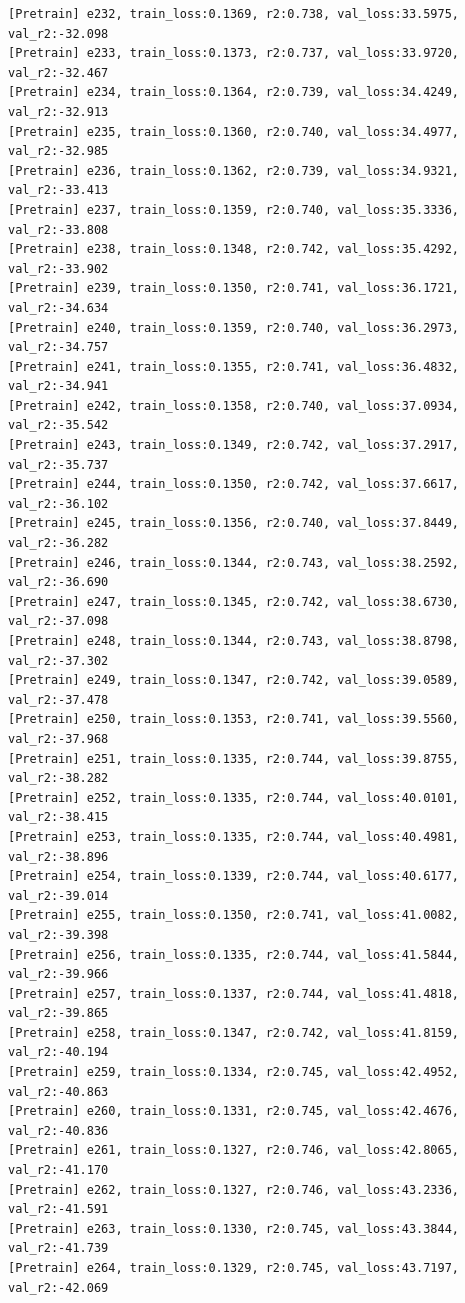 \documentclass[a4paper, 12pt]{article}
\begin{document}
\begin{lstlisting}
[Pretrain] e232, train_loss:0.1369, r2:0.738, val_loss:33.5975, val_r2:-32.098
[Pretrain] e233, train_loss:0.1373, r2:0.737, val_loss:33.9720, val_r2:-32.467
[Pretrain] e234, train_loss:0.1364, r2:0.739, val_loss:34.4249, val_r2:-32.913
[Pretrain] e235, train_loss:0.1360, r2:0.740, val_loss:34.4977, val_r2:-32.985
[Pretrain] e236, train_loss:0.1362, r2:0.739, val_loss:34.9321, val_r2:-33.413
[Pretrain] e237, train_loss:0.1359, r2:0.740, val_loss:35.3336, val_r2:-33.808
[Pretrain] e238, train_loss:0.1348, r2:0.742, val_loss:35.4292, val_r2:-33.902
[Pretrain] e239, train_loss:0.1350, r2:0.741, val_loss:36.1721, val_r2:-34.634
[Pretrain] e240, train_loss:0.1359, r2:0.740, val_loss:36.2973, val_r2:-34.757
[Pretrain] e241, train_loss:0.1355, r2:0.741, val_loss:36.4832, val_r2:-34.941
[Pretrain] e242, train_loss:0.1358, r2:0.740, val_loss:37.0934, val_r2:-35.542
[Pretrain] e243, train_loss:0.1349, r2:0.742, val_loss:37.2917, val_r2:-35.737
[Pretrain] e244, train_loss:0.1350, r2:0.742, val_loss:37.6617, val_r2:-36.102
[Pretrain] e245, train_loss:0.1356, r2:0.740, val_loss:37.8449, val_r2:-36.282
[Pretrain] e246, train_loss:0.1344, r2:0.743, val_loss:38.2592, val_r2:-36.690
[Pretrain] e247, train_loss:0.1345, r2:0.742, val_loss:38.6730, val_r2:-37.098
[Pretrain] e248, train_loss:0.1344, r2:0.743, val_loss:38.8798, val_r2:-37.302
[Pretrain] e249, train_loss:0.1347, r2:0.742, val_loss:39.0589, val_r2:-37.478
[Pretrain] e250, train_loss:0.1353, r2:0.741, val_loss:39.5560, val_r2:-37.968
[Pretrain] e251, train_loss:0.1335, r2:0.744, val_loss:39.8755, val_r2:-38.282
[Pretrain] e252, train_loss:0.1335, r2:0.744, val_loss:40.0101, val_r2:-38.415
[Pretrain] e253, train_loss:0.1335, r2:0.744, val_loss:40.4981, val_r2:-38.896
[Pretrain] e254, train_loss:0.1339, r2:0.744, val_loss:40.6177, val_r2:-39.014
[Pretrain] e255, train_loss:0.1350, r2:0.741, val_loss:41.0082, val_r2:-39.398
[Pretrain] e256, train_loss:0.1335, r2:0.744, val_loss:41.5844, val_r2:-39.966
[Pretrain] e257, train_loss:0.1337, r2:0.744, val_loss:41.4818, val_r2:-39.865
[Pretrain] e258, train_loss:0.1347, r2:0.742, val_loss:41.8159, val_r2:-40.194
[Pretrain] e259, train_loss:0.1334, r2:0.745, val_loss:42.4952, val_r2:-40.863
[Pretrain] e260, train_loss:0.1331, r2:0.745, val_loss:42.4676, val_r2:-40.836
[Pretrain] e261, train_loss:0.1327, r2:0.746, val_loss:42.8065, val_r2:-41.170
[Pretrain] e262, train_loss:0.1327, r2:0.746, val_loss:43.2336, val_r2:-41.591
[Pretrain] e263, train_loss:0.1330, r2:0.745, val_loss:43.3844, val_r2:-41.739
[Pretrain] e264, train_loss:0.1329, r2:0.745, val_loss:43.7197, val_r2:-42.069

\end{lstlisting}
\end{document}
